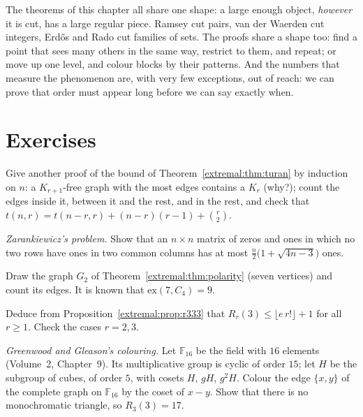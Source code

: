 \begin{beauty}
The theorems of this chapter all share one shape: a large enough object, \emph{however} it is cut, has a large regular piece. Ramsey cut pairs, van der Waerden cut
integers, Erd\H os and Rado cut families of sets. The proofs share a shape too: find a point that sees many others in the same way, restrict to them, and repeat;
or move up one level, and colour blocks by their patterns. And the numbers that measure the phenomenon are, with very few exceptions, out of reach: we can prove that
order must appear long before we can say exactly when.
\end{beauty}

\section{Exercises}

\begin{exercise}[$\star\star$]\label{extremal:ex:turaninduction}
Give another proof of the bound of Theorem~\ref{extremal:thm:turan} by induction on $n$: a $K_{r+1}$-free graph with the most edges contains a $K_r$ (why?); count the edges inside it,
between it and the rest, and in the rest, and check that $t(n,r)=t(n-r,r)+(n-r)(r-1)+\binom r2$.
\end{exercise}

\begin{exercise}[$\star\star$]\label{extremal:ex:zarankiewicz}
\emph{Zarankiewicz's problem.} Show that an $n\times n$ matrix of zeros and ones in which no two rows have ones in two common columns has at most $\frac n2\bigl(1+\sqrt{4n-3}\bigr)$
ones.
\end{exercise}

\begin{exercise}[$\star$]\label{extremal:ex:polarity}
Draw the graph $G_2$ of Theorem~\ref{extremal:thm:polarity} (seven vertices) and count its edges. It is known that $\mathrm{ex}(7,C_4)=9$.
\end{exercise}

\begin{exercise}[$\star$]\label{extremal:ex:schurbound}
Deduce from Proposition~\ref{extremal:prop:r333} that $R_r(3)\le\lfloor e\,r!\rfloor+1$ for all $r\ge1$. Check the cases $r=2,3$.
\end{exercise}

\begin{exercise}[$\star\star\star$]\label{extremal:ex:r333lower}
\emph{Greenwood and Gleason's colouring.} Let $\mathbb F_{16}$ be the field with $16$ elements (Volume~2, Chapter~9). Its multiplicative group is cyclic of order $15$; let $H$ be the subgroup of
cubes, of order $5$, with cosets $H$, $gH$, $g^2H$. Colour the edge $\{x,y\}$ of the complete graph on $\mathbb F_{16}$ by the coset of $x-y$. Show that there is no monochromatic
triangle, so $R_3(3)=17$.
\end{exercise}

